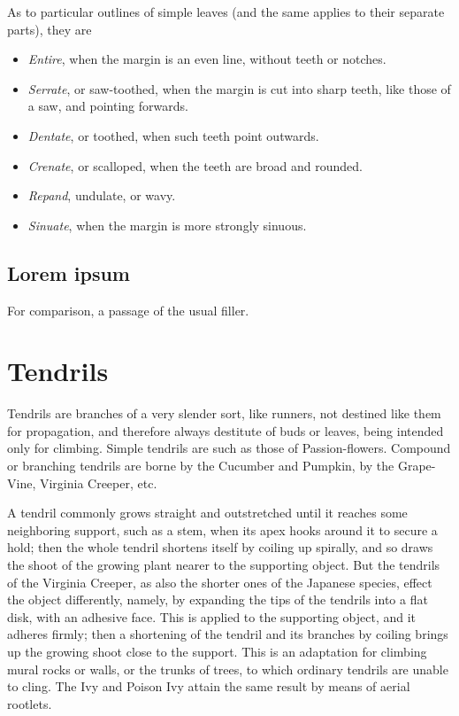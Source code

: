 \documentclass[11pt,twoside]{article}
\begin{document}
As to particular outlines of simple leaves (and the same applies to their
separate parts), they are

\begin{itemize}
\item \emph{Entire}, when the margin is an even line, without teeth or
  notches.
\item \emph{Serrate}, or saw-toothed, when the margin is cut into sharp
  teeth, like those of a saw, and pointing forwards.
\item \emph{Dentate}, or toothed, when such teeth point outwards.
\item \emph{Crenate}, or scalloped, when the teeth are broad and rounded.
\item \emph{Repand}, undulate, or wavy.
\item \emph{Sinuate}, when the margin is more strongly sinuous.
\end{itemize}

\subsection{Lorem ipsum}
For comparison, a passage of the usual filler.

\lipsum[1-2]

\clearpage
{}
\section{Tendrils}

Tendrils are branches of a very slender sort, like runners, not destined
like them for propagation, and therefore always destitute of buds or
leaves, being intended only for climbing. Simple tendrils are such as those
of Passion-flowers. Compound or branching tendrils are borne by the
Cucumber and Pumpkin, by the Grape-Vine, Virginia Creeper, etc.

A tendril commonly grows straight and outstretched until it reaches some
neighboring support, such as a stem, when its apex hooks around it to
secure a hold; then the whole tendril shortens itself by coiling up
spirally, and so draws the shoot of the growing plant nearer to the
supporting object. But the tendrils of the Virginia Creeper, as also the
shorter ones of the Japanese species, effect the object differently,
namely, by expanding the tips of the tendrils into a flat disk, with an
adhesive face. This is applied to the supporting object, and it adheres
firmly; then a shortening of the tendril and its branches by coiling
brings up the growing shoot close to the support. This is an adaptation
for climbing mural rocks or walls, or the trunks of trees, to which
ordinary tendrils are unable to cling. The Ivy and Poison Ivy attain the
same result by means of aerial rootlets.
\end{document}
